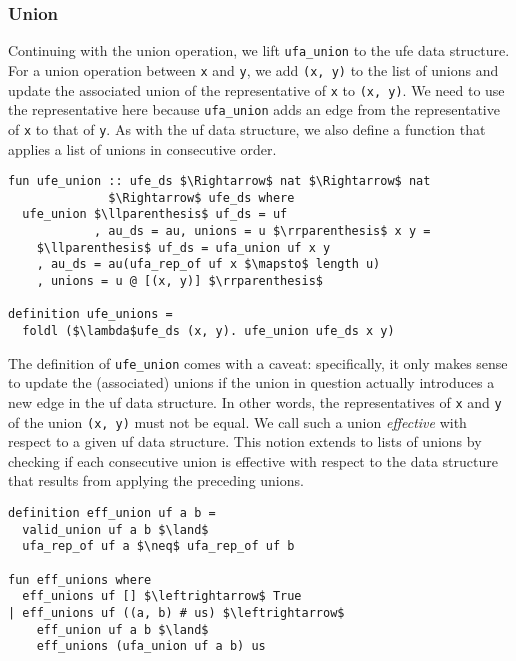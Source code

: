 \documentclass[
  sigplan,
  10pt,
  anonymous,
  review,
  ]{acmart}
\newcommand{\opunion}{union}
\begin{document}
\subsubsection{Union}
Continuing with the \opunion{} operation, we lift \lstinline|ufa_union| to the \acrshort{ufe} data structure.
For a \opunion{} operation between \lstinline|x| and \lstinline|y|, we add \lstinline|(x, y)| to the list of unions and update the associated union of the representative of \lstinline|x| to \lstinline|(x, y)|.
We need to use the representative here because \lstinline|ufa_union| adds an edge from the representative of \lstinline|x| to that of \lstinline|y|.
As with the \acrshort{uf} data structure, we also define a function that applies a list of unions in consecutive order.
\begin{lstlisting}
fun ufe_union :: ufe_ds $\Rightarrow$ nat $\Rightarrow$ nat
              $\Rightarrow$ ufe_ds where
  ufe_union $\llparenthesis$ uf_ds = uf
            , au_ds = au, unions = u $\rrparenthesis$ x y =
    $\llparenthesis$ uf_ds = ufa_union uf x y
    , au_ds = au(ufa_rep_of uf x $\mapsto$ length u)
    , unions = u @ [(x, y)] $\rrparenthesis$

definition ufe_unions = 
  foldl ($\lambda$ufe_ds (x, y). ufe_union ufe_ds x y)
\end{lstlisting}
The definition of \lstinline|ufe_union| comes with a caveat:
specifically, it only makes sense to update the (associated) unions if the union in question actually introduces a new edge in the \acrshort{uf} data structure.
In other words, the representatives of \lstinline|x| and \lstinline|y| of the union \lstinline|(x, y)| must not be equal.
We call such a union \emph{effective} with respect to a given \acrshort{uf} data structure.
This notion extends to lists of unions by checking if each consecutive union is effective with respect to the data structure that results from applying the preceding unions.
\begin{lstlisting}
definition eff_union uf a b =
  valid_union uf a b $\land$
  ufa_rep_of uf a $\neq$ ufa_rep_of uf b

fun eff_unions where
  eff_unions uf [] $\leftrightarrow$ True
| eff_unions uf ((a, b) # us) $\leftrightarrow$
    eff_union uf a b $\land$
    eff_unions (ufa_union uf a b) us
\end{lstlisting}
\end{document}
